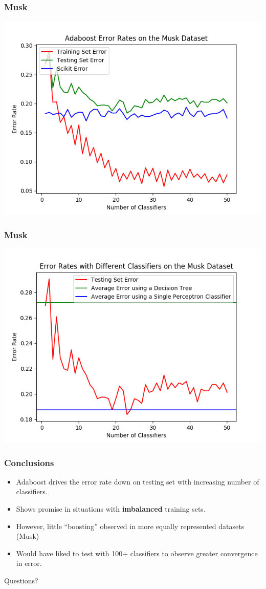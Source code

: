 \documentclass{beamer}
\begin{document}
\begin{frame}
\frametitle{Musk}
\begin{center}
\includegraphics[width=0.8\linewidth]{Musk_1.png}
\end{center}
\end{frame}
\begin{frame}
\frametitle{Musk}
\begin{center}
\includegraphics[width=0.8\linewidth]{Musk_different_classifiers_1.png}
\end{center}
\end{frame}
\begin{frame}
\frametitle{Conclusions}
\begin{itemize}
\item Adaboost drives the error rate down on testing set with increasing number of classifiers.
\item Shows promise in situations with \textbf{imbalanced} training sets. 
\item However, little ``boosting'' observed in more equally represented datasets (Musk) 
\item Would have liked to test with 100+ classifiers to observe greater convergence in error.  
\end{itemize}
\end{frame}
\begin{frame}
\Huge{\centerline{Questions?}}
\end{frame}
\end{document}
